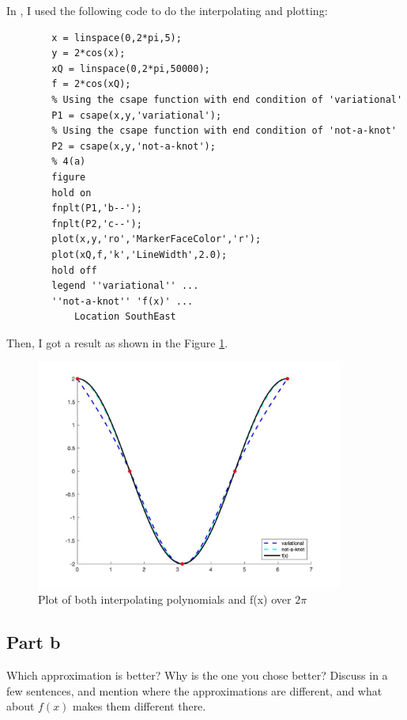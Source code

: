 \begin{answer}
    In \MATLAB, I used the following code to do the interpolating and plotting:
    \begin{verbatim}
        x = linspace(0,2*pi,5);
        y = 2*cos(x);
        xQ = linspace(0,2*pi,50000);
        f = 2*cos(xQ);
        % Using the csape function with end condition of 'variational'
        P1 = csape(x,y,'variational');
        % Using the csape function with end condition of 'not-a-knot'
        P2 = csape(x,y,'not-a-knot');
        % 4(a)
        figure
        hold on
        fnplt(P1,'b--');
        fnplt(P2,'c--');
        plot(x,y,'ro','MarkerFaceColor','r');
        plot(xQ,f,'k','LineWidth',2.0);
        hold off
        legend ''variational'' ...
        ''not-a-knot'' 'f(x)' ...
            Location SouthEast
    \end{verbatim}
    Then, I got a result as shown in the Figure \ref{fig:fig7}.
    \begin{figure}[H]
        \centering
        \includegraphics[width=0.9\textwidth]{Figure 7.jpg}
        \caption{\label{fig:fig7}Plot of both interpolating polynomials and f(x) over $2\pi$}
    \end{figure}
\end{answer}

\subsection{Part b}

\begin{question}
    Which approximation is better? Why is the one you chose better? Discuss in a few sentences, and mention where the approximations are different, and what about $f(x)$ makes them different there.
\end{question}

